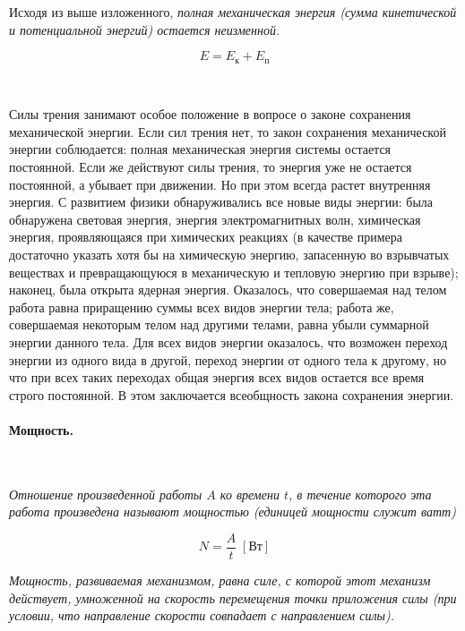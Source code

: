 \documentclass[a4paper,12pt]{article}
\begin{document}
		Исходя из выше изложенного, \textit{полная механическая энергия (сумма кинетической и 
		потенциальной энергий) остается неизменной}.

		\begin{equation}
			E = E_{\text{к}} + E_{\text{п}}
		\end{equation}

		\

		Силы трения занимают особое положение в вопросе о законе сохранения механической энергии. 
		Если сил трения нет, то закон сохранения механической энергии соблюдается: полная механическая 
		энергия системы остается постоянной. Если же действуют силы трения, то энергия уже не остается 
		постоянной, а убывает при движении. Но при этом всегда растет внутренняя энергия. С развитием 
		физики обнаруживались все новые виды энергии: была обнаружена световая энергия, энергия 
		электромагнитных волн, химическая энергия, проявляющаяся при химических реакциях (в качестве 
		примера достаточно указать хотя бы на химическую энергию, запасенную во взрывчатых веществах 
		и превращающуюся в механическую и тепловую энергию при взрыве); наконец, была открыта ядерная 
		энергия. Оказалось, что совершаемая над телом работа равна приращению суммы всех видов энергии 
		тела; работа же, совершаемая некоторым телом над другими телами, равна убыли суммарной энергии 
		данного тела. Для всех видов энергии оказалось, что возможен переход энергии из одного вида в 
		другой, переход энергии от одного тела к другому, но что при всех таких переходах общая энергия 
		всех видов остается все время строго постоянной. В этом заключается всеобщность закона сохранения 
		энергии.

		\paragraph{Мощность.} \

		\textit{Отношение произведенной работы $A$ ко времени $t$, в течение которого эта работа произведена
		называют мощностью (единицей мощности служит ватт)}

		\begin{equation}
			N = \frac{A}{t} \; [\text{Вт}]
		\end{equation}

		\textit{Мощность, развиваемая механизмом, равна силе, с которой этот механизм действует, умноженной
		на скорость перемещения точки приложения силы (при условии, что направление скорости совпадает с 
		направлением силы).}
\end{document}
